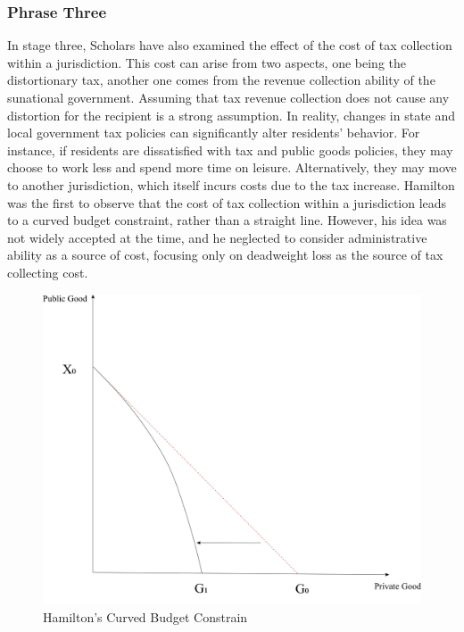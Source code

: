 \subsubsection{Phrase Three}

In stage three, Scholars have also examined the effect of the cost of tax collection within a jurisdiction. This cost can arise from two aspects, one being the distortionary tax, another one comes from the revenue collection ability of the sunational government. Assuming that tax revenue collection does not cause any distortion for the recipient is a strong assumption. In reality, changes in state and local government tax policies can significantly alter residents' behavior. For instance, if residents are dissatisfied with tax and public goods policies, they may choose to work less and spend more time on leisure. Alternatively, they may move to another jurisdiction, which itself incurs costs due to the tax increase. Hamilton \cite{hamilton1986flypaper} was the first to observe that the cost of tax collection within a jurisdiction leads to a curved budget constraint, rather than a straight line. However, his idea was not widely accepted at the time, and he neglected to consider administrative ability as a source of cost, focusing only on deadweight loss as the source of tax collecting cost.

\begin{figure}[H]
    \centering
    \includegraphics[scale=0.4]{Chapter-4/Figures/budget constrain distortion.jpg}
    \caption[Hamilton's Curved Budget Constraint]{Hamilton's Curved Budget Constrain
        \texttt{} }
    \label{Figure 3.4}
\end{figure}

